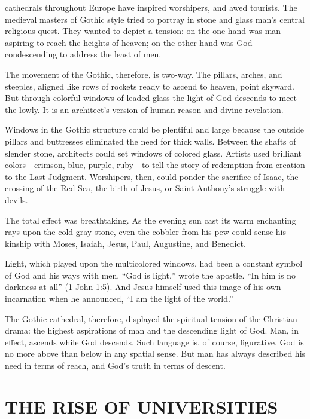
 cathedrals throughout Europe have inspired worshipers, and
awed tourists. The medieval masters of Gothic style tried to portray in stone and glass man’s
central religious quest. They wanted to depict a tension: on the one hand was man aspiring to reach
the heights of heaven; on the other hand was God condescending to address the least of men.

The movement of the Gothic, therefore, is two-way. The pillars, arches, and steeples, aligned like
rows of rockets ready to ascend to heaven, point skyward. But through colorful windows of leaded
glass the light of God descends to meet the lowly. It is an architect’s version of human reason and
divine revelation.

Windows in the Gothic structure could be plentiful and large because the outside pillars and
buttresses eliminated the need for thick walls. Between the shafts of slender stone, architects
could set windows of colored glass. Artists used brilliant colors—crimson, blue, purple, ruby—to
tell the story of redemption from creation to the Last Judgment. Worshipers, then, could ponder the
sacrifice of Isaac, the crossing of the Red Sea, the birth of Jesus, or Saint Anthony’s struggle
with devils.

The total effect was breathtaking. As the evening sun cast its warm enchanting rays upon the cold
gray stone, even the cobbler from his pew could sense his kinship with Moses, Isaiah, Jesus, Paul,
Augustine, and Benedict.

Light, which played upon the multicolored windows, had been a constant symbol of God and his ways
with men. “God is light,” wrote the apostle. “In him is no darkness at all” (1 John 1:5). And Jesus
himself used this image of his own incarnation when he announced, “I am the light of the world.”

The Gothic cathedral, therefore, displayed the spiritual tension of the Christian drama: the highest
aspirations of man and the descending light of God. Man, in effect, ascends while God descends. Such
language is, of course, figurative. God is no more above than below in any spatial sense. But man
has always described his need in terms of reach, and God’s truth in terms of descent.

\section{THE RISE OF UNIVERSITIES}


